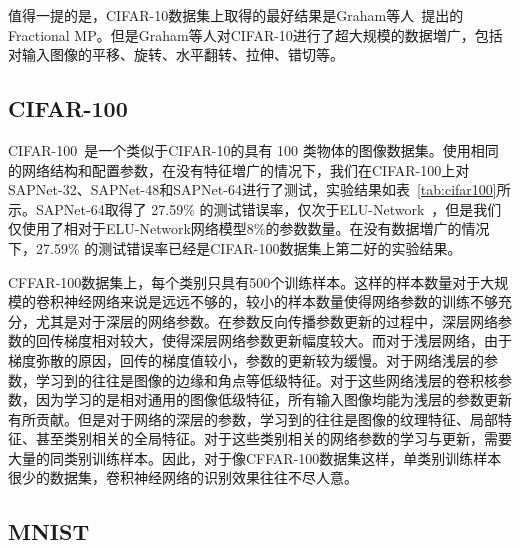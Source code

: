 值得一提的是，CIFAR-10数据集上取得的最好结果是Graham等人~\cite{graham2014fractional}提出的Fractional MP。但是Graham等人对CIFAR-10进行了超大规模的数据増广，包括对输入图像的平移、旋转、水平翻转、拉伸、错切等。

\subsection{CIFAR-100}
\label{sec:sap:cifar100}

CIFAR-100~\cite{krizhevsky2009learning}是一个类似于CIFAR-10的具有 100 类物体的图像数据集。使用相同的网络结构和配置参数，在没有特征増广的情况下，我们在CIFAR-100上对SAPNet-32、SAPNet-48和SAPNet-64进行了测试，实验结果如表~\ref{tab:cifar100}所示。SAPNet-64取得了 27.59\% 的测试错误率，仅次于ELU-Network~\cite{clevert2015fast}，但是我们仅使用了相对于ELU-Network网络模型8\%的参数数量。在没有数据増广的情况下，27.59\% 的测试错误率已经是CIFAR-100数据集上第二好的实验结果。

CFFAR-100数据集上，每个类别只具有500个训练样本。这样的样本数量对于大规模的卷积神经网络来说是远远不够的，较小的样本数量使得网络参数的训练不够充分，尤其是对于深层的网络参数。在参数反向传播参数更新的过程中，深层网络参数的回传梯度相对较大，使得深层网络参数更新幅度较大。而对于浅层网络，由于梯度弥散的原因，回传的梯度值较小，参数的更新较为缓慢。对于网络浅层的参数，学习到的往往是图像的边缘和角点等低级特征。对于这些网络浅层的卷积核参数，因为学习的是相对通用的图像低级特征，所有输入图像均能为浅层的参数更新有所贡献。但是对于网络的深层的参数，学习到的往往是图像的纹理特征、局部特征、甚至类别相关的全局特征。对于这些类别相关的网络参数的学习与更新，需要大量的同类别训练样本。因此，对于像CFFAR-100数据集这样，单类别训练样本很少的数据集，卷积神经网络的识别效果往往不尽人意。


\subsection{MNIST}
\label{sec:sap:mnist}

